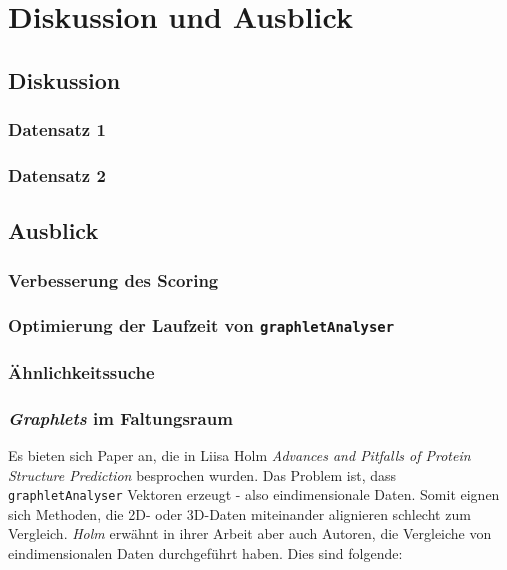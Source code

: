 \documentclass{report}
\begin{document}
\chapter{Diskussion und Ausblick}



\section{Diskussion}

\subsection{Datensatz 1}

\subsection{Datensatz 2}

\section{Ausblick}

\subsection{Verbesserung des Scoring}

\subsection{Optimierung der Laufzeit von \texttt{graphletAnalyser}}

\subsection{\"Ahnlichkeitssuche}

\subsection{\textit{Graphlets} im Faltungsraum}



Es bieten sich Paper an, die in Liisa Holm \textit{Advances and Pitfalls of Protein Structure Prediction} besprochen wurden. Das Problem ist, dass \texttt{graphletAnalyser} Vektoren erzeugt - also eindimensionale Daten. Somit eignen sich Methoden, die 2D- oder 3D-Daten miteinander alignieren schlecht zum Vergleich. \textit{Holm} erw\"ahnt in ihrer Arbeit aber auch Autoren, die Vergleiche von eindimensionalen Daten durchgef\"uhrt haben. Dies sind folgende:
\end{document}
